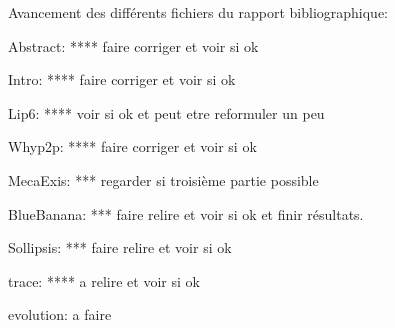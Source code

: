 Avancement des différents fichiers du rapport bibliographique:

Abstract: **** faire corriger et voir si ok 

Intro: **** faire corriger et voir si ok

Lip6: **** voir si ok et peut etre reformuler un peu
 
Whyp2p: **** faire corriger et voir si ok

MecaExis: *** regarder si troisième partie possible

BlueBanana: *** faire relire et voir si ok et finir résultats.

Sollipsis: *** faire relire et voir si ok

trace: **** a relire et voir si ok

evolution: a faire

